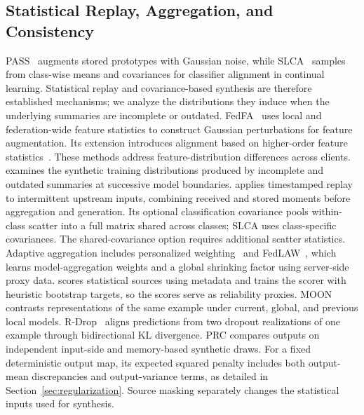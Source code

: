 \subsection{Statistical Replay, Aggregation, and Consistency}
PASS~\cite{9578909} augments stored prototypes with Gaussian noise, while SLCA~\cite{zhang2023slca} samples from class-wise means and covariances for classifier alignment in continual learning. Statistical replay and covariance-based synthesis are therefore established mechanisms; we analyze the distributions they induce when the underlying summaries are incomplete or outdated. FedFA~\cite{zhou2023fedfa} uses local and federation-wide feature
statistics to construct Gaussian perturbations for feature
augmentation. Its extension introduces alignment based on
higher-order feature statistics~\cite{zhou2024featureaugmentation}.
These methods address feature-distribution differences across
clients. \ehsfp{} examines the synthetic training distributions
produced by incomplete and outdated summaries at successive
model boundaries. \ehsfp{} applies timestamped replay to intermittent upstream inputs, combining received and stored moments before aggregation and generation. Its optional classification covariance pools within-class scatter into a full matrix shared across classes; SLCA uses class-specific covariances. The shared-covariance option requires additional scatter statistics.
Adaptive aggregation includes personalized weighting~\cite{zhang2020personalized} and FedLAW~\cite{pmlr-v202-li23s}, which learns model-aggregation weights and a global shrinking factor using server-side proxy data. \ehsfp{} scores statistical sources using metadata and trains the scorer with heuristic bootstrap targets, so the scores serve as reliability proxies.
MOON~\cite{9578660} contrasts representations of the same example under current, global, and previous local models. R-Drop~\cite{liang2021rdrop} aligns predictions from two dropout realizations of one example through bidirectional KL divergence. PRC compares outputs on independent input-side and memory-based synthetic draws. For a fixed deterministic output map, its expected squared penalty includes both output-mean discrepancies and output-variance terms, as detailed in Section~\ref{sec:regularization}. Source masking separately changes the statistical inputs used for synthesis.

